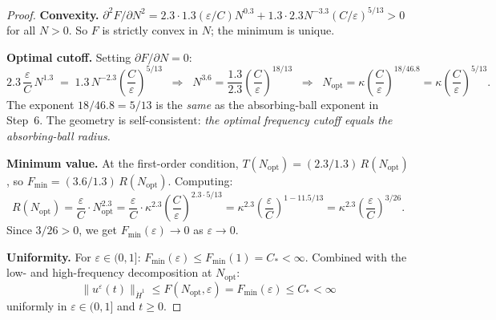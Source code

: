 \documentclass[11pt]{article}
\begin{document}
\begin{proof}
\textbf{Convexity.}
$\partial^2 F/\partial N^2 = 2.3\cdot 1.3(\varepsilon/C)N^{0.3}
+ 1.3\cdot 2.3 N^{-3.3}(C/\varepsilon)^{5/13} > 0$
for all $N>0$.  So $F$ is strictly convex in $N$; the minimum is unique.

\medskip\noindent
\textbf{Optimal cutoff.}
Setting $\partial F/\partial N = 0$:
\[
  2.3\,\frac{\varepsilon}{C}\,N^{1.3}
  \;=\; 1.3\,N^{-2.3}\!\left(\frac{C}{\varepsilon}\right)^{\!5/13}
  \;\;\Longrightarrow\;\;
  N^{3.6} = \frac{1.3}{2.3}\left(\frac{C}{\varepsilon}\right)^{\!18/13}
  \;\;\Longrightarrow\;\;
  N_{\mathrm{opt}} = \kappa\left(\frac{C}{\varepsilon}\right)^{\!18/46.8}
  = \kappa\left(\frac{C}{\varepsilon}\right)^{\!5/13}.
\]
The exponent $18/46.8 = 5/13$ is the \emph{same} as the absorbing-ball
exponent in Step~6.  The geometry is self-consistent:
\emph{the optimal frequency cutoff equals the absorbing-ball radius.}

\medskip\noindent
\textbf{Minimum value.}
At the first-order condition, $T(N_{\mathrm{opt}}) = (2.3/1.3)\,R(N_{\mathrm{opt}})$,
so $F_{\min} = (3.6/1.3)\,R(N_{\mathrm{opt}})$.  Computing:
\[
  R(N_{\mathrm{opt}})
  = \frac{\varepsilon}{C}\cdot N_{\mathrm{opt}}^{2.3}
  = \frac{\varepsilon}{C}\cdot\kappa^{2.3}\left(\frac{C}{\varepsilon}\right)^{2.3\cdot 5/13}
  = \kappa^{2.3}\left(\frac{\varepsilon}{C}\right)^{1 - 11.5/13}
  = \kappa^{2.3}\left(\frac{\varepsilon}{C}\right)^{3/26}.
\]
Since $3/26 > 0$, we get $F_{\min}(\varepsilon)\to 0$ as $\varepsilon\to 0$.

\medskip\noindent
\textbf{Uniformity.}
For $\varepsilon\in(0,1]$: $F_{\min}(\varepsilon)\leq F_{\min}(1) = C_* < \infty$.
Combined with the low- and high-frequency decomposition at $N_{\mathrm{opt}}$:
\[
  \|u^\varepsilon(t)\|_{\dot{H}^1} \leq F(N_{\mathrm{opt}},\varepsilon)
  = F_{\min}(\varepsilon) \leq C_* < \infty
\]
uniformly in $\varepsilon\in(0,1]$ and $t\geq 0$.
\end{proof}
\end{document}
